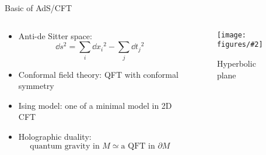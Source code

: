 \documentclass[aspectratio=169]{beamer}
\newcommand\imageinput[2][]{\texttt{[image: figures/\#2]}}
\def\AdSCFT{AdS/CFT}
\begin{document}
\begin{frame}{Basic of \AdSCFT{}}
\begin{columns}
  \begin{column}{0.68\textwidth}
    \begin{itemize}
      \item Anti-de Sitter space:
        \[ \dd{s}^2 = \sum_i \dd{x_i}^2 - \sum_j \dd{t_j}^2 \]
      \item Conformal field theory: QFT with conformal symmetry
      \item Ising model: one of a minimal model in 2D CFT
      \item Holographic duality:
        \[ \text{quantum gravity in $M$} \simeq \text{a QFT in $\partial{M}$}\]
    \end{itemize}
  \end{column}
  \begin{column}{0.31\textwidth}
    \begin{figure}
      \centering
      \imageinput[width=\textwidth]{hyperbolic-plane.png}
      \caption{Hyperbolic plane \footnotemark}
    \end{figure}
  \end{column}
\end{columns}
\end{frame}
\end{document}
